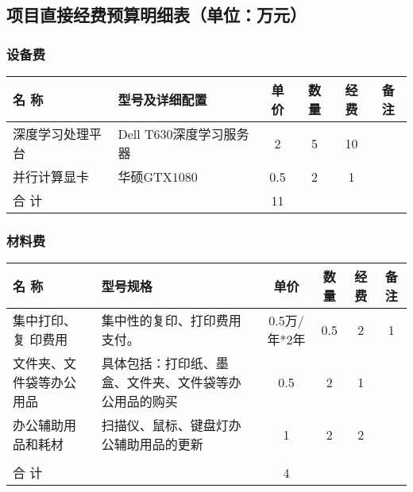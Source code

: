 \subsection{项目直接经费预算明细表（单位：万元）}

\subsubsection{设备费}
\begin{table}[H]
	\centering
	\begin{tabular}{m{3cm} m{5cm} cccc}
		\toprule
		名  称           & 型号及详细配置          & 单价 & 数量 & 经费 & 备注
		\\
		\midrule
		深度学习处理平台 & Dell T630深度学习服务器 & 2    & 5    & 10
		\\
		并行计算显卡     & 华硕GTX1080             & 0.5  & 2    & 1
		\\
		合 计            &                         & 11   &
		                 &                                                     \\
		\bottomrule
	\end{tabular}
\end{table}

\subsubsection{材料费}
\begin{table}[H]
	\centering
	\begin{tabular}{m{3cm} m{3.5cm} cccc}
		\toprule
		名  称                   & 型号规格                                               & 单价         & 数量 & 经费 & 备注
		\\
		\midrule
		集中打印、复
		印费用                   & 集中性的复印、打印费用支付。                           & 0.5万/年*2年 & 0.5  & 2    & 1
		\\
		文件夹、文件袋等办公用品 & 具体包括：打印纸、墨盒、文件夹、文件袋等办公用品的购买 & 0.5          & 2    & 1           \\
		办公辅助用品和耗材       & 扫描仪、鼠标、键盘灯办公辅助用品的更新                 & 1            & 2    & 2           \\
		\\
		合 计                    &                                                        & 4            &
		                         &                                                                                            \\
		\bottomrule
	\end{tabular}
\end{table}


